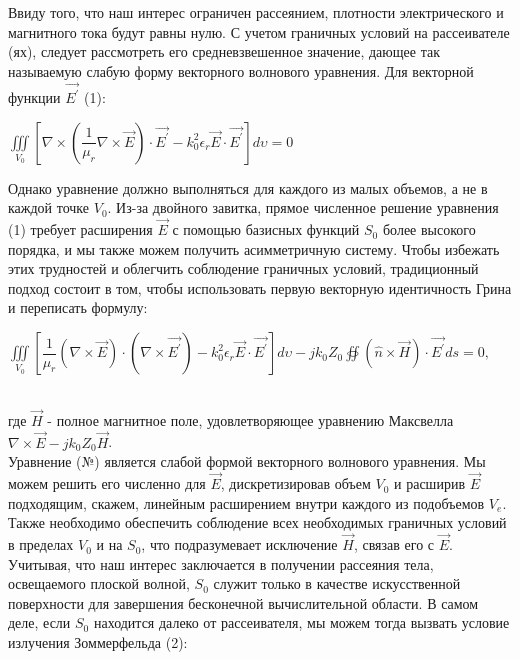 Ввиду того, что наш интерес ограничен рассеянием, плотности электрического и магнитного тока будут равны нулю.
С учетом граничных условий на рассеивателе (ях), следует рассмотреть его средневзвешенное значение, дающее так называемую слабую форму векторного волнового уравнения. Для векторной функции $ \vec{E^{'}} $ (1):\\
\begin{center}
	$ 	\iiint\limits_{V_{0}}^{} \left[ \nabla \times \left( \dfrac{1}{\mu_{r}}\nabla \times \vec{E}\right)\cdot \vec{E^{'}} - k_{0}^{2} \epsilon_{r}\vec{E} \cdot \vec{E^{'}} \right]d\upsilon = 0 $
\end{center}
Однако уравнение должно выполняться для каждого из малых объемов, а не в каждой точке $ V_{0} $. Из-за двойного завитка, прямое численное решение уравнения (1) требует расширения $ \vec{E} $ с помощью базисных функций $ S_{0} $ более высокого порядка, и мы также можем получить асимметричную систему. Чтобы избежать этих трудностей и облегчить соблюдение граничных условий, традиционный подход состоит в том, чтобы использовать первую векторную идентичность Грина и переписать формулу: \\
\begin{center}
	$ 	\iiint\limits_{V_{0}}^{} \left[ \dfrac{1}{\mu_{r}}(\nabla \times \vec{E}) \cdot (\nabla \times \vec{E^{'}}) - k_{0}^{2} \epsilon_{r}\vec{E} \cdot \vec{E^{'}} \right]d\upsilon - jk_{0}Z_{0} \oiint (\hat{n} \times \vec{H}) \cdot \vec{E^{'}}ds = 0,$
\end{center}\\
где $ \vec{H} $ - полное магнитное поле, удовлетворяющее уравнению Максвелла $ \nabla \times \vec{E} - jk_{0}Z_{0}\vec{H}  $.\\
Уравнение (№) является слабой формой векторного волнового уравнения. Мы можем решить его численно для $ \vec{E} $, дискретизировав объем $ V_{0} $ и расширив $ \vec{E} $ подходящим, скажем, линейным расширением внутри каждого из подобъемов $V_{e}$. \\
Также необходимо обеспечить соблюдение всех необходимых граничных условий в пределах $V_{0}$ и на $S_{0}$, что подразумевает исключение $\vec{H}$, связав его с $\vec{E}$. \\
Учитывая, что наш интерес заключается в получении рассеяния тела, освещаемого плоской волной, $S_{0}$ служит только в качестве искусственной поверхности для завершения бесконечной вычислительной области. В самом деле, если $S_{0}$ находится далеко от рассеивателя, мы можем тогда вызвать условие излучения Зоммерфельда (2): \\
